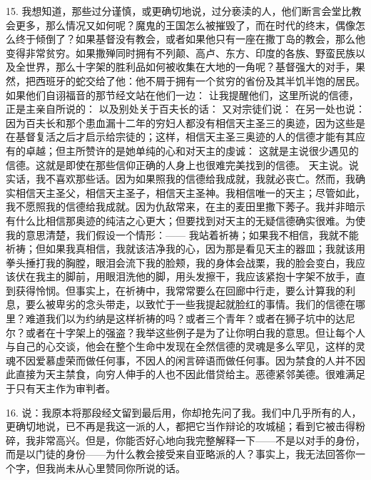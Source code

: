 15. 我想知道，那些过分谨慎，或更确切地说，过分亵渎的人，他们断言会堂比教会更多，那么情况又如何呢？魔鬼的王国怎么被摧毁了，而在时代的终末，偶像怎么终于倾倒了？如果基督没有教会，或者如果他只有一座在撒丁岛的教会，那么他变得非常贫穷。如果撒殚同时拥有不列颠、高卢、东方、印度的各族、野蛮民族以及全世界，那么十字架的胜利品如何被收集在大地的一角呢？基督强大的对手，果然，把西班牙的蛇交给了他：他不屑于拥有一个贫穷的省份及其半饥半饱的居民。如果他们自诩福音的那节经文站在他们一边：  让我提醒他们，这里所说的信德，正是主亲自所说的：  以及别处关于百夫长的话：  又对宗徒们说：  在另一处也说：  因为百夫长和那个患血漏十二年的穷妇人都没有相信天主圣三的奥迹，因为这些是在基督复活之后才启示给宗徒的；这样，相信天主圣三奥迹的人的信德才能有其应有的卓越；但主所赞许的是她单纯的心和对天主的虔诚：  这就是主说很少遇见的信德。这就是即使在那些信仰正确的人身上也很难完美找到的信德。  天主说。说实话，我不喜欢那些话。因为如果照我的信德给我成就，我就必丧亡。然而，我确实相信天主圣父，相信天主圣子，相信天主圣神。我相信唯一的天主；尽管如此，我不愿照我的信德给我成就。因为仇敌常来，在主的麦田里撒下莠子。我并非暗示有什么比相信那奥迹的纯洁之心更大；但要找到对天主的无疑信德确实很难。为使我的意思清楚，我们假设一个情形：—— 我站着祈祷；如果我不相信，我就不能祈祷；但如果我真相信，我就该洁净我的心，因为那是看见天主的器皿；我就该用拳头捶打我的胸膛，眼泪会流下我的脸颊，我的身体会战栗，我的脸会变白，我应该伏在我主的脚前，用眼泪洗他的脚，用头发擦干，我应该紧抱十字架不放手，直到获得怜悯。但事实上，在祈祷中，我常常要么在回廊中行走，要么计算我的利息，要么被卑劣的念头带走，以致忙于一些我提起就脸红的事情。我们的信德在哪里？难道我们以为约纳是这样祈祷的吗？或者三个青年？或者在狮子坑中的达尼尔？或者在十字架上的强盗？我举这些例子是为了让你明白我的意思。但让每个人与自己的心交谈，他会在整个生命中发现在全然信德的灵魂是多么罕见，这样的灵魂不因爱慕虚荣而做任何事，不因人的闲言碎语而做任何事。因为禁食的人并不因此直接为天主禁食，向穷人伸手的人也不因此借贷给主。恶德紧邻美德。很难满足于只有天主作为审判者。\par

16. 说：我原本将那段经文留到最后用，你却抢先问了我。我们中几乎所有的人，更确切地说，已不再是我这一派的人，都把它当作辩论的攻城槌；看到它被击得粉碎，我非常高兴。但是，你能否好心地向我完整解释一下——不是以对手的身份，而是以门徒的身份——为什么教会接受来自亚略派的人？事实上，我无法回答你一个字，但我尚未从心里赞同你所说的话。\par

